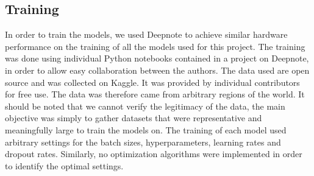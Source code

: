 \subsection{Training}
In order to train the models, we used Deepnote\cite{deepnote} to achieve similar hardware performance on the training of all the models used for this project. 
The training was done using individual Python notebooks contained in a project on Deepnote, in order to allow easy collaboration between the authors.
The data used are open source and was collected on Kaggle\cite{kaggle}. It was provided by individual contributors for free use.
The data was therefore came from arbitrary regions of the world. 
It should be noted that we cannot verify the legitimacy of the data, the main objective was simply to gather datasets that were representative and meaningfully large to train the models on. 
The training of each model used arbitrary settings for the batch sizes, hyperparameters, learning rates and dropout rates. Similarly, no optimization algorithms were implemented in order to identify the optimal settings. 